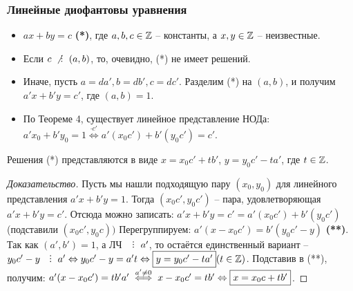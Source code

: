 

\begin{frame}[t]
    \frametitle{\normalsize \bf Линейные диофантовы уравнения}
    \begin{itemize}
        \item $ax + by = c$ \textbf{(*)}, где  $a,b,c \in \mathbb{Z}$ -- константы, а $x, y \in \mathbb{Z}$ -- неизвестные.
        \item Если $c \nDiv \left( a,b \right)$, то, очевидно, (*) не имеет решений.
        \item Иначе, пусть $a = da', b = db', c = dc'$. Разделим (*) на $\left( a,b \right)$, и получим $a'x + b'y = c'$, где $\left( a,b \right) = 1$.
        \item По Теореме 4, существует линейное представление НОДа: $a'x_0 + b'y_0 = 1 \overset{\cdot c'} \Leftrightarrow a'(x_0c') + b'(y_0c') = c'$. 
    \end{itemize}

\end{frame}

\begin{frame}[t]
    \setcounter{theorem}{9}
    \begin{theorem}
        Решения (*) представляются в виде $x = x_0c' + tb'$, $y = y_0c' - ta'$, где $t \in \mathbb{Z}$.
    \end{theorem}
    
    \begin{proof}[Доказательство]
        Пусть мы нашли подходящую пару $\left( x_0, y_0 \right) $ для линейного представления $a'x + b'y = 1$. Тогда $\left( x_0c', y_0c' \right) $ -- пара, удовлетворяющая $a'x + b'y = c'$. Отсюда можно записать: $a'x + b'y = c' = a'(x_0c') + b'(y_0c') $ (подставили $\left( x_0c', y_0c \right)) $ Перегруппируем: $a'(x - x_0c') = b'(y_0c' - y)$ \textbf{(**)}. Так как $\left( a',b' \right) = 1$, а ЛЧ $\Div a'$, то остаётся единственный вариант --  $y_0c' - y \Div a' \Leftrightarrow y_0c' - y = a't \Leftrightarrow \fbox{$y = y_0c' - ta'$} (t \in \Z)$. Подставив в (**), получим: $a'(x - x_0c') = tb'a' \overset{a' \neq 0} \iff x - x_0c' = tb' \Leftrightarrow \fbox{$x = x_0c + tb'$}$.
    \end{proof}
    
\end{frame}




